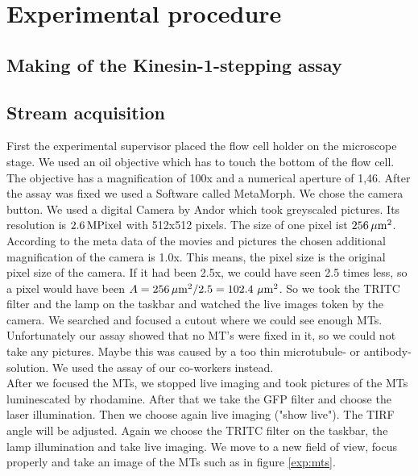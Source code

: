 \section{Experimental procedure}
\subsection{Making of the Kinesin-1-stepping assay}

\subsection{Stream acquisition}
        First the experimental supervisor placed the flow cell holder on the microscope stage. We used an oil objective which has to touch the bottom of the flow cell. The objective has a magnification of 100x and a numerical aperture of 1,46.  
        After the assay was fixed we used a Software called MetaMorph. We chose the camera button. We used a digital Camera by Andor which took greyscaled pictures. Its resolution is $\unit[2.6]{MPixel}$ with 512x512 pixels. The size of one pixel ist $\unit[256]{\mu m^2}$.
        According to the meta data of the movies and pictures the chosen additional magnification of the camera is 1.0x. This means, the pixel size is the original pixel size of the camera. If it had been 2.5x, we could have seen 2.5 times less, so a pixel would have been $A = \unit[256]{\mu m^2} / 2.5 = 102.4\ \unit{\mu m^2}$. 
        So we took the TRITC filter and the lamp on the taskbar and watched the live images token by the camera. We searched and focused a cutout where we could see enough MTs. 
        Unfortunately our assay showed that no MT's were fixed in it, so we could not take any pictures. Maybe this was caused by a too thin microtubule- or antibody-solution. We used the assay of our co-workers instead.\\ 
        After we focused the MTs, we stopped live imaging and took pictures of the MTs luminescated by rhodamine. After that we take the GFP filter and choose the laser illumination. Then we choose again live imaging ("show live"). The TIRF angle will be adjusted.  %
        Again we choose the TRITC filter on the taskbar, the lamp illumination and take live imaging. We move to a new field of view, focus properly and take an image of the MTs such as in figure \ref{exp:mts}.\\
